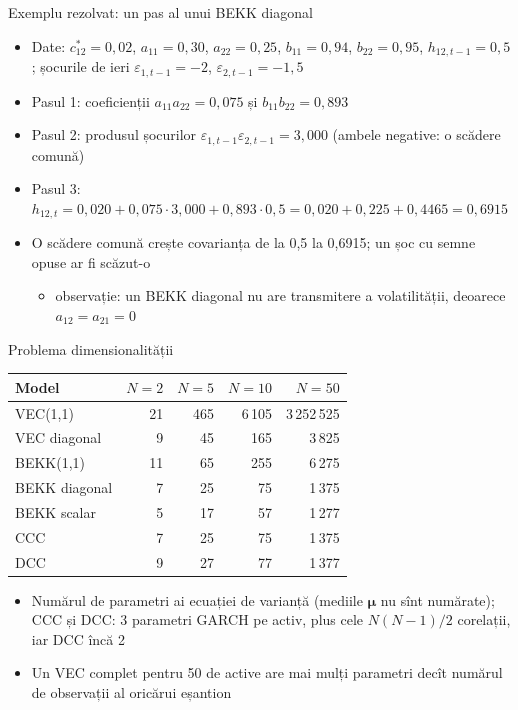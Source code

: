 \begin{frame}{Exemplu rezolvat: un pas al unui BEKK diagonal}
\itemsize{\small}
\begin{itemize}
    \item Date: $c_{12}^* = 0{,}02$, $a_{11} = 0{,}30$, $a_{22} = 0{,}25$, $b_{11} = 0{,}94$, $b_{22} = 0{,}95$, $h_{12,t-1} = 0{,}5$; șocurile de ieri $\varepsilon_{1,t-1} = -2$, $\varepsilon_{2,t-1} = -1{,}5$
    \item Pasul 1: coeficienții $a_{11}a_{22} = 0{,}075$ și $b_{11}b_{22} = 0{,}893$
    \item Pasul 2: produsul șocurilor $\varepsilon_{1,t-1}\varepsilon_{2,t-1} = 3{,}000$ (ambele negative: o scădere comună)
    \item Pasul 3: $h_{12,t} = 0{,}020 + 0{,}075 \cdot 3{,}000 + 0{,}893 \cdot 0{,}5 = 0{,}020 + 0{,}225 + 0{,}4465 = 0{,}6915$
    \item O scădere comună crește covarianța de la 0,5 la 0{,}6915; un șoc cu semne opuse ar fi scăzut-o
    \begin{itemize}
        \item observație: un BEKK diagonal nu are transmitere a volatilității, deoarece $a_{12} = a_{21} = 0$
    \end{itemize}
\end{itemize}
\end{frame}

\begin{frame}{Problema dimensionalității}
\itemsize{\footnotesize}
\begin{center}
\small
\begin{tabular}{lrrrr}
\toprule
\textbf{Model} & $N = 2$ & $N = 5$ & $N = 10$ & $N = 50$ \\
\midrule
VEC(1,1) & 21 & 465 & 6\,105 & 3\,252\,525 \\
VEC diagonal & 9 & 45 & 165 & 3\,825 \\
BEKK(1,1) & 11 & 65 & 255 & 6\,275 \\
BEKK diagonal & 7 & 25 & 75 & 1\,375 \\
BEKK scalar & 5 & 17 & 57 & 1\,277 \\
CCC & 7 & 25 & 75 & 1\,375 \\
DCC & 9 & 27 & 77 & 1\,377 \\
\bottomrule
\end{tabular}
\end{center}
\begin{itemize}
    \item Numărul de parametri ai ecuației de varianță (mediile $\boldsymbol{\mu}$ nu sînt numărate); CCC și DCC: 3 parametri GARCH pe activ, plus cele $N(N-1)/2$ corelații, iar DCC încă 2
    \item Un VEC complet pentru 50 de active are mai mulți parametri decît numărul de observații al oricărui eșantion
\end{itemize}
\end{frame}

